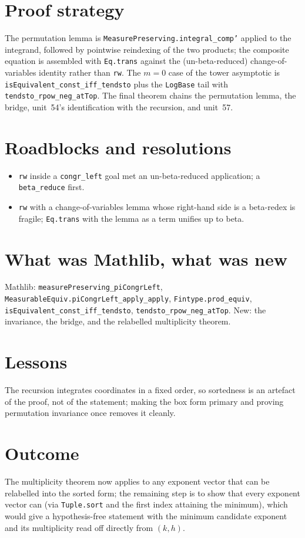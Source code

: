 \documentclass[11pt]{article}
\begin{document}
\section{Proof strategy}
The permutation lemma is \texttt{MeasurePreserving.integral\_comp'} applied to the integrand,
followed by pointwise reindexing of the two products; the composite equation is assembled with
\texttt{Eq.trans} against the (un-beta-reduced) change-of-variables identity rather than \texttt{rw}.
The $m=0$ case of the tower asymptotic is \texttt{isEquivalent\_const\_iff\_tendsto} plus the
\texttt{LogBase} tail with \texttt{tendsto\_rpow\_neg\_atTop}. The final theorem chains the permutation
lemma, the bridge, unit~54's identification with the recursion, and unit~57.

\section{Roadblocks and resolutions}
\begin{itemize}
\item \texttt{rw} inside a \texttt{congr\_left} goal met an un-beta-reduced application; a
\texttt{beta\_reduce} first.
\item \texttt{rw} with a change-of-variables lemma whose right-hand side is a beta-redex is fragile;
\texttt{Eq.trans} with the lemma as a term unifies up to beta.
\end{itemize}

\section{What was Mathlib, what was new}
Mathlib: \texttt{measurePreserving\_piCongrLeft}, \texttt{MeasurableEquiv.piCongrLeft\_apply\_apply},
\texttt{Fintype.prod\_equiv}, \texttt{isEquivalent\_const\_iff\_tendsto}, \texttt{tendsto\_rpow\_neg\_atTop}.
New: the invariance, the bridge, and the relabelled multiplicity theorem.

\section{Lessons}
The recursion integrates coordinates in a fixed order, so sortedness is an artefact of the proof, not
of the statement; making the box form primary and proving permutation invariance once removes it
cleanly.

\section{Outcome}
The multiplicity theorem now applies to any exponent vector that can be relabelled into the sorted
form; the remaining step is to show that every exponent vector can (via \texttt{Tuple.sort} and the
first index attaining the minimum), which would give a hypothesis-free statement with the minimum
candidate exponent and its multiplicity read off directly from $(k,h)$.
\end{document}
